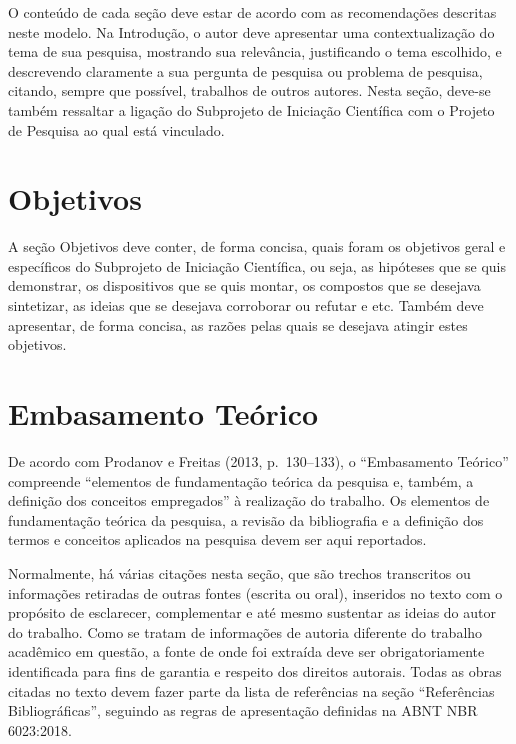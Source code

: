 \documentclass[10pt,a4paper]{article}
\begin{document}
\vspace{\baselineskip}
O conteúdo de cada seção deve estar de acordo com as recomendações descritas neste modelo. Na Introdução, o autor deve apresentar uma contextualização do tema de sua pesquisa, mostrando sua relevância, justificando o tema escolhido, e descrevendo claramente a sua pergunta de pesquisa ou problema de pesquisa, citando, sempre que possível, trabalhos de outros autores. Nesta seção, deve-se também ressaltar a ligação do Subprojeto de Iniciação Científica com o Projeto de Pesquisa ao qual está vinculado.

\section{Objetivos}
A seção Objetivos deve conter, de forma concisa, quais foram os objetivos geral e específicos do Subprojeto de Iniciação Científica, ou seja, as hipóteses que se quis demonstrar, os dispositivos que se quis montar, os compostos que se desejava sintetizar, as ideias que se desejava corroborar ou refutar e etc. Também deve apresentar, de forma concisa, as razões pelas quais se desejava atingir estes objetivos.

\section{Embasamento Teórico}
De acordo com Prodanov e Freitas (2013, p.~130--133), o ``Embasamento Teórico'' compreende ``elementos de fundamentação teórica da pesquisa e, também, a definição dos conceitos empregados'' à realização do trabalho. Os elementos de fundamentação teórica da pesquisa, a revisão da bibliografia e a definição dos termos e conceitos aplicados na pesquisa devem ser aqui reportados.

\vspace{\baselineskip}
Normalmente, há várias citações nesta seção, que são trechos transcritos ou informações retiradas de outras fontes (escrita ou oral), inseridos no texto com o propósito de esclarecer, complementar e até mesmo sustentar as ideias do autor do trabalho. Como se tratam de informações de autoria diferente do trabalho acadêmico em questão, a fonte de onde foi extraída deve ser obrigatoriamente identificada para fins de garantia e respeito dos direitos autorais. Todas as obras citadas no texto devem fazer parte da lista de referências na seção ``Referências Bibliográficas'', seguindo as regras de apresentação definidas na ABNT NBR 6023:2018.
\end{document}
